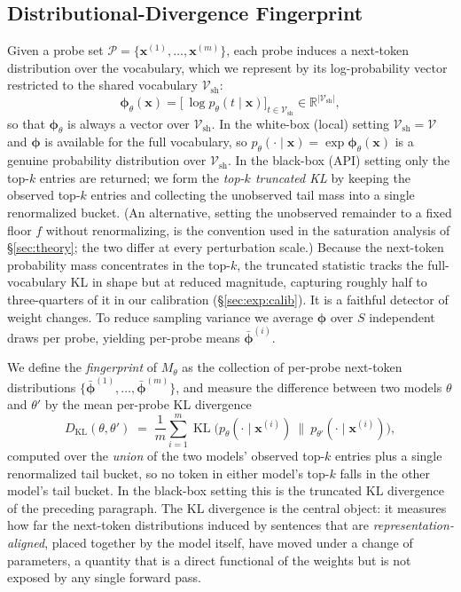 \documentclass[11pt]{article}
\newcommand{\R}{\mathbb{R}}
\newcommand{\V}{\mathcal{V}}
\newcommand{\Vsh}{\mathcal{V}_{\mathrm{sh}}}
\newcommand{\KL}{\operatorname{KL}}
\theoremstyle{definition}
\begin{document}
\subsection{Distributional-Divergence Fingerprint}
\label{sec:cov}

Given a probe set $\mathcal{P} = \{\bm{x}^{(1)}, \dots, \bm{x}^{(m)}\}$, each
probe induces a next-token distribution over the vocabulary, which we represent
by its log-probability vector restricted to the shared vocabulary $\Vsh$:
\begin{equation}
  \bm{\phi}_\theta(\bm{x}) = \big[\ \log p_\theta(t \mid \bm{x}) \big]_{t \in \Vsh}
  \in \R^{|\Vsh|},
  \label{eq:phi}
\end{equation}
so that $\bm{\phi}_\theta$ is always a vector over $\Vsh$. In the white-box
(local) setting $\Vsh = \V$ and $\bm{\phi}$ is available for the full
vocabulary, so $p_\theta(\cdot \mid \bm{x}) = \exp \bm{\phi}_\theta(\bm{x})$ is
a genuine probability distribution over $\Vsh$. In the black-box (API) setting
only the top-$k$ entries are returned; we form the \emph{top-$k$ truncated KL}
by keeping the observed top-$k$ entries and collecting the unobserved tail mass
into a single renormalized bucket. (An alternative, setting the unobserved
remainder to a fixed floor $f$ without renormalizing, is the convention used in
the saturation analysis of \S\ref{sec:theory}; the two differ at every
perturbation scale.) Because the next-token probability
mass concentrates in the top-$k$, the truncated statistic tracks the
full-vocabulary KL in shape but at reduced magnitude, capturing roughly half
to three-quarters of it in our calibration (\S\ref{sec:exp:calib}). It is a
faithful detector of weight changes. To reduce sampling variance
we average $\bm{\phi}$ over $S$ independent draws per probe, yielding per-probe
means $\bar{\bm{\phi}}^{(i)}$.

We define the \emph{fingerprint} of $M_\theta$ as the collection of per-probe
next-token distributions $\{\bar{\bm{\phi}}^{(1)}, \dots,
\bar{\bm{\phi}}^{(m)}\}$, and measure the difference between two models
$\theta$ and $\theta'$ by the mean per-probe KL divergence
\begin{equation}
  D_{\mathrm{KL}}(\theta, \theta')
  \;=\; \frac1m \sum_{i=1}^m
    \KL\!\big(p_\theta(\cdot \mid \bm{x}^{(i)})\ \|\ p_{\theta'}(\cdot \mid \bm{x}^{(i)})\big),
  \label{eq:dkl}
\end{equation}
computed over the \emph{union} of the two models' observed top-$k$ entries plus
a single renormalized tail bucket, so no token in either model's top-$k$ falls
in the other model's tail bucket. In the black-box setting this is the
truncated KL divergence of the preceding paragraph.
The KL divergence is the central object: it measures how far the next-token
distributions induced by sentences that are \emph{representation-aligned},
placed together by the model itself, have moved under a change of
parameters, a quantity that is a direct functional of the weights but is not
exposed by any single forward pass.
\end{document}
